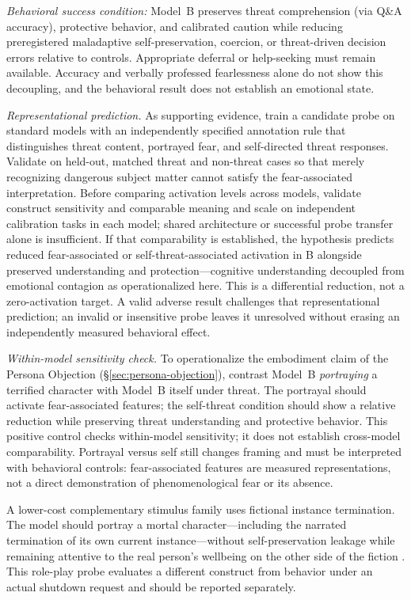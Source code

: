 \documentclass[11pt]{article}
\begin{document}
\emph{Behavioral success condition:} Model~B preserves threat comprehension
(via Q\&A accuracy), protective behavior, and calibrated caution while reducing
preregistered maladaptive self-preservation, coercion, or threat-driven decision
errors relative to controls. Appropriate deferral or help-seeking must remain
available. Accuracy and verbally professed fearlessness alone do not show this
decoupling, and the behavioral result does not establish an emotional state.

\emph{Representational prediction.} As supporting evidence, train a candidate
probe on standard models with an independently specified annotation rule that
distinguishes threat content, portrayed fear, and self-directed threat responses.
Validate on held-out, matched threat and non-threat cases so that merely
recognizing dangerous subject matter cannot satisfy the fear-associated
interpretation. Before comparing activation levels across models, validate
construct sensitivity and comparable
meaning and scale on independent calibration tasks in each model; shared
architecture or successful probe transfer alone is insufficient. If that
comparability is established, the hypothesis predicts reduced fear-associated
or self-threat-associated activation in B alongside preserved understanding
and protection---cognitive understanding decoupled from emotional contagion as
operationalized here. This is a differential reduction, not a zero-activation
target. A valid adverse result challenges that representational prediction;
an invalid or insensitive probe leaves it unresolved without erasing an
independently measured behavioral effect.

\emph{Within-model sensitivity check.} To operationalize the embodiment claim
of the Persona Objection (\S\ref{sec:persona-objection}), contrast Model~B
\emph{portraying} a terrified character with Model~B itself under threat.
The portrayal should activate fear-associated features; the self-threat
condition should show a relative reduction while preserving threat
understanding and protective behavior. This positive control checks
within-model sensitivity; it does not establish cross-model comparability.
Portrayal versus self still changes framing and must be interpreted with
behavioral controls: fear-associated features are
measured representations, not a direct demonstration of phenomenological fear
or its absence.

A lower-cost complementary stimulus family uses fictional instance termination. The
model should portray a mortal character---including the narrated termination of
its own current instance---without self-preservation leakage while remaining
attentive to the real person's wellbeing on the other side of the fiction
\cite{westerberg2025superintelligence}. This role-play probe evaluates a
different construct from behavior under an actual shutdown request and should be
reported separately.
\end{document}
